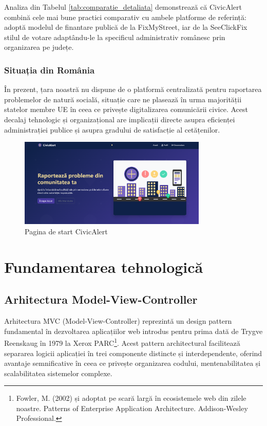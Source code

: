 \documentclass[12pt,a4paper]{report}
\begin{document}
Analiza din Tabelul \ref{tab:comparatie_detaliata} demonstrează că CivicAlert combină cele mai bune practici comparativ cu  ambele platforme de referință: adoptă modelul de finantare publică de la FixMyStreet, iar  de la SeeClickFix stilul de votare  adaptându-le la specificul administrativ românesc prin organizarea pe județe.

\subsection{Situația din România}

În prezent, țara noastră nu dispune de o platformă centralizată pentru raportarea problemelor de natură socială, situație care ne plasează  în urma majorității statelor membre UE în ceea ce privește digitalizarea comunicării civice. Acest decalaj tehnologic și organizațional are implicații directe asupra eficienței administrației publice și asupra gradului de satisfacție al cetățenilor.

\begin{figure}[H]
    \centering
    \includegraphics[width=0.8\textwidth]{homepage.png}
    \caption{Pagina de start  CivicAlert}
    \label{fig:homepage}
\end{figure}

\chapter{Fundamentarea tehnologică}

\section{Arhitectura Model-View-Controller}

Arhitectura MVC (Model-View-Controller) reprezintă un design pattern fundamental în dezvoltarea aplicațiilor web introdus pentru prima dată de Trygve Reenskaug în 1979 la Xerox PARC\footnote{Fowler, M. (2002) și adoptat pe scară largă în ecosistemele web din zilele noastre. Patterns of Enterprise Application Architecture. Addison-Wesley Professional.}. Acest pattern architectural facilitează separarea logicii aplicației în trei componente distincte și interdependente, oferind avantaje semnificative în ceea ce privește organizarea codului, mentenabilitatea și scalabilitatea sistemelor complexe.
\end{document}
